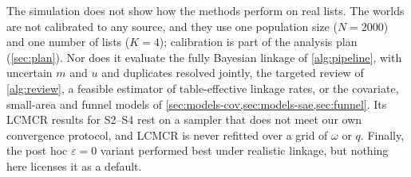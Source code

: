 The simulation does not show how the methods perform on real lists. The worlds are not calibrated to any source, and they use one population size ($N=2000$) and one number of lists ($K=4$); calibration is part of the analysis plan (\cref{sec:plan}). Nor does it evaluate the fully Bayesian linkage of \cref{alg:pipeline}, with uncertain $m$ and $u$ and duplicates resolved jointly, the targeted review of \cref{alg:review}, a feasible estimator of table-effective linkage rates, or the covariate, small-area and funnel models of \cref{sec:models-cov,sec:models-sae,sec:funnel}. Its LCMCR results for S2--S4 rest on a sampler that does not meet our own convergence protocol, and LCMCR is never refitted over a grid of $\omega$ or $q$. Finally, the post hoc $\varepsilon=0$ variant performed best under realistic linkage, but nothing here licenses it as a default.
